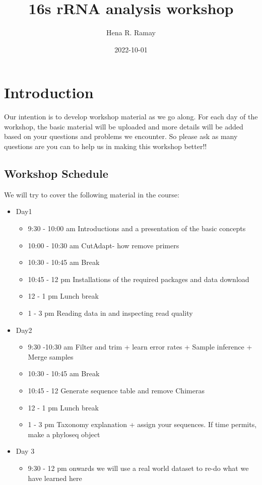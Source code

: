\documentclass[
]{book}
\title{16s rRNA analysis workshop}
\author{Hena R. Ramay}
\date{2022-10-01}
\providecommand{\tightlist}{%
  \setlength{\itemsep}{0pt}\setlength{\parskip}{0pt}}
\begin{document}
\maketitle

{
\setcounter{tocdepth}{1}
\tableofcontents
}
\hypertarget{introduction}{%
\chapter{Introduction}\label{introduction}}

Our intention is to develop workshop material as we go along. For each day of the workshop, the basic material will be uploaded and more details will be added based on your questions and problems we encounter. So please ask as many questions are you can to help us in making this workshop better!!

\hypertarget{workshop-schedule}{%
\section{Workshop Schedule}\label{workshop-schedule}}

We will try to cover the following material in the course:

\begin{itemize}
\tightlist
\item
  Day1

  \begin{itemize}
  \tightlist
  \item
    9:30 - 10:00 am Introductions and a presentation of the basic concepts
  \item
    10:00 - 10:30 am CutAdapt- how remove primers
  \item
    10:30 - 10:45 am Break
  \item
    10:45 - 12 pm Installations of the required packages and data download
  \item
    12 - 1 pm Lunch break
  \item
    1 - 3 pm Reading data in and inspecting read quality
  \end{itemize}
\item
  Day2

  \begin{itemize}
  \tightlist
  \item
    9:30 -10:30 am Filter and trim + learn error rates + Sample inference + Merge samples
  \item
    10:30 - 10:45 am Break
  \item
    10:45 - 12 Generate sequence table and remove Chimeras
  \item
    12 - 1 pm Lunch break
  \item
    1 - 3 pm Taxonomy explanation + assign your sequences. If time permits, make a phyloseq object
  \end{itemize}
\item
  Day 3

  \begin{itemize}
  \tightlist
  \item
    9:30 - 12 pm onwards we will use a real world dataset to re-do what we have learned here
  \end{itemize}
\end{itemize}
\end{document}
